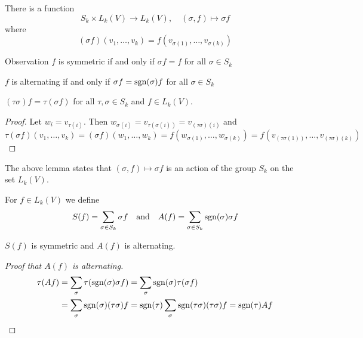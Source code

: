 \begin{frame}
  There is a function 
  \begin{displaymath}
    S_k \times L_k(V) \to L_k(V), \quad (\sigma, f) \mapsto \sigma f
  \end{displaymath}
  where 
  \begin{displaymath}
    (\sigma f)(v_1, \dots, v_k) = f(v_{\sigma(1)}, \dots, v_{\sigma(k)})
  \end{displaymath}
  \begin{block}
    {Observation}
    $f$ is symmetric if and only if $\sigma f = f$ for all $\sigma \in S_k$

    $f$ is alternating if and only if $\sigma f = \operatorname{sgn}(\sigma)f$ for all
    $\sigma \in S_k$
  \end{block}
  \begin{lemma}
    $(\tau \sigma) f = \tau(\sigma f)$ for all $\tau, \sigma \in S_k$ and $f
    \in L_k(V)$.
  \end{lemma}
  \begin{proof}
    Let $w_i = v_{\tau(i)}$. Then $w_{\sigma(i)} = v_{\tau(\sigma(i))} =
    v_{(\tau \sigma)(i)}$ and
    \begin{displaymath}
      \tau(\sigma f)(v_1, \dots, v_k) = (\sigma f)(w_1, \dots, w_k)
      = f(w_{\sigma(1)}, \dots, w_{\sigma(k)}) =
      f(v_{(\tau \sigma(1))}, \dots, v_{(\tau \sigma)(k)})
    \end{displaymath}
  \end{proof}
\end{frame}
\begin{frame}
  The above lemma states that $(\sigma, f) \mapsto \sigma f$ is an
  action of the group $S_k$ on the set $L_k(V)$.
  \begin{definition}
    For $f \in L_k(V)$ we define
    \begin{displaymath}
      S(f) = \sum_{\sigma \in S_k} \sigma f
      \quad \text{and} \quad
      A(f) = \sum_{\sigma \in S_k} \operatorname{sgn}(\sigma)\sigma f
    \end{displaymath}
  \end{definition}
  \begin{prop}
    $S(f)$ is symmetric and $A(f)$ is alternating.
  \end{prop}
  \begin{proof}[Proof that $A(f)$ is alternating]
    \begin{align*}
      \tau(Af) &= \sum_{\sigma} \tau(\operatorname{sgn}(\sigma) \sigma f) =
      \sum_{\sigma} \operatorname{sgn}(\sigma) \tau(\sigma f)\\
      &= \sum_\sigma \operatorname{sgn}(\sigma) (\tau \sigma) f =
      \operatorname{sgn}(\tau) \sum_{\sigma} \operatorname{sgn}(\tau \sigma) (\tau \sigma) f = \operatorname{sgn}(\tau) Af
    \end{align*}
  \end{proof}
\end{frame}
